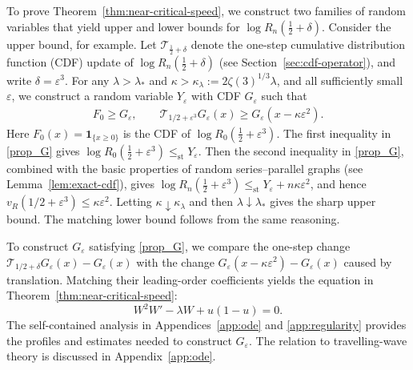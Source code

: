 \documentclass[12pt]{amsart}
\numberwithin{equation}{section}
\theoremstyle{plain}
\theoremstyle{definition}
\newcommand{\stle}{\le_{\mathrm{st}}}
\begin{document}
To prove Theorem~\ref{thm:near-critical-speed}, we construct two families of random variables that yield upper and lower bounds for $\log R_n(\frac12+\delta)$. Consider the upper bound, for example. Let $\mathcal T_{\frac12+\delta}$ denote the one-step cumulative distribution function (CDF)
update of $\log R_n(\frac12+\delta)$ (see Section~\ref{sec:cdf-operator}), and write $\delta=\varepsilon^3$. For any
\(\lambda>\lambda_*\) and
\(\kappa>\kappa_\lambda:=2\zeta(3)^{1/3}\lambda\), and all sufficiently
small \(\varepsilon\), we construct a random variable
\(Y_\varepsilon\) with CDF \(G_\varepsilon\) such that
\begin{align}\label{prop_G}
 F_0\ge G_\varepsilon,
 \qquad
 \mathcal T_{1/2+\varepsilon^3}G_\varepsilon(x)
 \ge G_\varepsilon(x-\kappa\varepsilon^2).
\end{align}
Here $F_0(x)=\mathbf 1_{\{x\ge0\}}$ is the CDF of $\log R_0(\frac12+\varepsilon^3)$. The first inequality in \eqref{prop_G} gives $\log R_0(\frac12+\varepsilon^3)
 \stle Y_\varepsilon$. Then the second inequality in \eqref{prop_G}, combined with the basic properties of random series--parallel graphs (see Lemma~\ref{lem:exact-cdf}), gives
  $\log R_n(\frac12+\varepsilon^3)
 \stle Y_\varepsilon+n\kappa\varepsilon^2$, and hence
\(v_R(1/2+\varepsilon^3)\le\kappa\varepsilon^2\).
Letting \(\kappa\downarrow\kappa_\lambda\) and then
\(\lambda\downarrow\lambda_*\) gives the sharp upper bound. The matching
lower bound follows from the same reasoning.

To construct \(G_\varepsilon\) satisfying \eqref{prop_G}, we compare the  one-step change
\(\mathcal T_{1/2+\delta}G_\varepsilon(x)-G_\varepsilon(x)\) with the change
\(G_\varepsilon(x-\kappa\varepsilon^2)-G_\varepsilon(x)\) caused by translation.
 Matching their leading-order coefficients yields the
equation in Theorem~\ref{thm:near-critical-speed}:
\[
 W^2W'-\lambda W+u(1-u)=0.
\]
The self-contained analysis in Appendices~\ref{app:ode} and
\ref{app:regularity} provides the profiles and estimates needed to construct
\(G_\varepsilon\). The relation to travelling-wave theory is discussed in
Appendix~\ref{app:ode}.
\end{document}

